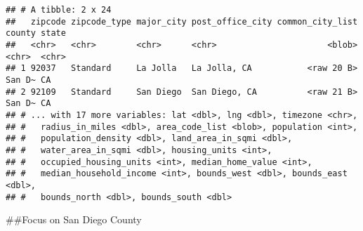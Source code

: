 \documentclass[
]{article}
\newenvironment{Shaded}{\begin{snugshade}}{\end{snugshade}}
\newcommand{\FunctionTok}[1]{\textcolor[rgb]{0.00,0.00,0.00}{#1}}
\newcommand{\NormalTok}[1]{#1}
\newcommand{\SpecialCharTok}[1]{\textcolor[rgb]{0.00,0.00,0.00}{#1}}
\begin{document}
\begin{verbatim}
## # A tibble: 2 x 24
##   zipcode zipcode_type major_city post_office_city common_city_list county state
##   <chr>   <chr>        <chr>      <chr>                      <blob> <chr>  <chr>
## 1 92037   Standard     La Jolla   La Jolla, CA           <raw 20 B> San D~ CA   
## 2 92109   Standard     San Diego  San Diego, CA          <raw 21 B> San D~ CA   
## # ... with 17 more variables: lat <dbl>, lng <dbl>, timezone <chr>,
## #   radius_in_miles <dbl>, area_code_list <blob>, population <int>,
## #   population_density <dbl>, land_area_in_sqmi <dbl>,
## #   water_area_in_sqmi <dbl>, housing_units <int>,
## #   occupied_housing_units <int>, median_home_value <int>,
## #   median_household_income <int>, bounds_west <dbl>, bounds_east <dbl>,
## #   bounds_north <dbl>, bounds_south <dbl>
\end{verbatim}

\#\#Focus on San Diego County

\begin{Shaded}
\end{Shaded}
\end{document}
